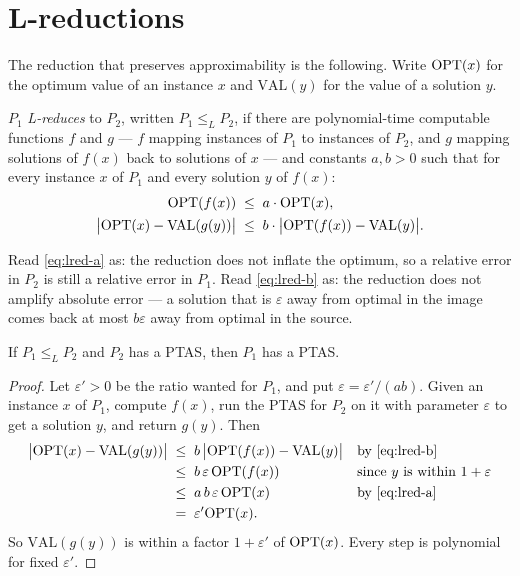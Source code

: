 \section{L-reductions}
\label{sec:l-reductions}

The reduction that preserves approximability is the following. Write
$\mathrm{OPT}(x)$ for the optimum value of an instance $x$ and $\mathrm{VAL}(y)$ for the
value of a solution $y$.

\begin{definition}[L-reduction]\label{def:l-reduction}
$P_1$ \emph{L-reduces} to $P_2$, written $P_1 \le_L P_2$, if there are
polynomial-time computable functions $f$ and $g$ --- $f$ mapping instances of
$P_1$ to instances of $P_2$, and $g$ mapping solutions of $f(x)$ back to
solutions of $x$ --- and constants $a, b > 0$ such that for every instance $x$
of $P_1$ and every solution $y$ of $f(x)$:
\begin{align}
  \mathrm{OPT}(f(x)) &\;\le\; a \cdot \mathrm{OPT}(x), \label{eq:lred-a}\\
  \bigl|\mathrm{OPT}(x) - \mathrm{VAL}(g(y))\bigr|
    &\;\le\; b \cdot \bigl|\mathrm{OPT}(f(x)) - \mathrm{VAL}(y)\bigr|.
    \label{eq:lred-b}
\end{align}
\end{definition}

Read \eqref{eq:lred-a} as: the reduction does not inflate the optimum, so a
relative error in $P_2$ is still a relative error in $P_1$. Read
\eqref{eq:lred-b} as: the reduction does not amplify absolute error --- a
solution that is $\varepsilon$ away from optimal in the image comes back at
most $b\varepsilon$ away from optimal in the source.

\begin{theorem}\label{thm:lred-preserves-ptas}
If $P_1 \le_L P_2$ and $P_2$ has a PTAS, then $P_1$ has a PTAS.
\end{theorem}

\begin{proof}
Let $\varepsilon' > 0$ be the ratio wanted for $P_1$, and put
$\varepsilon = \varepsilon'/(ab)$. Given an instance $x$ of $P_1$, compute
$f(x)$, run the PTAS for $P_2$ on it with parameter $\varepsilon$ to get a
solution $y$, and return $g(y)$. Then
\begin{align*}
  \bigl|\mathrm{OPT}(x) - \mathrm{VAL}(g(y))\bigr|
    &\;\le\; b\,\bigl|\mathrm{OPT}(f(x)) - \mathrm{VAL}(y)\bigr|
      && \text{by \eqref{eq:lred-b}} \\
    &\;\le\; b\,\varepsilon\, \mathrm{OPT}(f(x))
      && \text{since $y$ is within $1+\varepsilon$} \\
    &\;\le\; a\,b\,\varepsilon\, \mathrm{OPT}(x)
      && \text{by \eqref{eq:lred-a}} \\
    &\;=\; \varepsilon' \mathrm{OPT}(x).
\end{align*}
So $\mathrm{VAL}(g(y))$ is within a factor $1+\varepsilon'$ of $\mathrm{OPT}(x)$. Every
step is polynomial for fixed $\varepsilon'$.
\end{proof}


